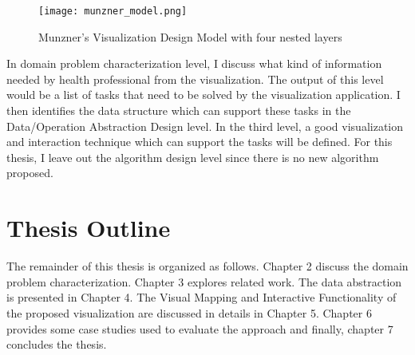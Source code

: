 \begin{figure}
\centering
\texttt{[image: munzner\_model.png]}
\caption{Munzner's Visualization Design Model with four nested layers \label{munzner_model}}
\end{figure}

In domain problem characterization level, I discuss what kind of information needed by health professional from the visualization. The output of this level would be a list of tasks that need to be solved by the visualization application. I then identifies the data structure which can support these tasks in the Data/Operation Abstraction Design level. In the third level, a good visualization and interaction technique which can support the tasks will be defined. For this thesis, I leave out the algorithm design level since there is no new algorithm proposed.

\section{Thesis Outline}

The remainder of this thesis is organized as follows. Chapter 2 discuss the domain problem characterization. Chapter 3 explores related work. The data abstraction is presented in Chapter 4. The Visual Mapping and Interactive Functionality of the proposed visualization are discussed in details in Chapter 5. Chapter 6 provides some case studies used to evaluate the approach and finally, chapter 7 concludes the thesis.
